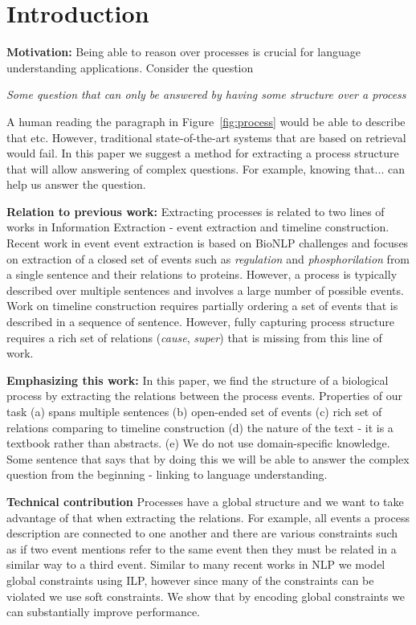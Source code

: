 \section{Introduction}

\textbf{Motivation:} Being able to reason over processes is crucial for language understanding applications. Consider the question 

\begin{description}
\item \emph{Some question that can only be answered by having some structure over a process}
\end{description}

\noindent A human reading the paragraph in Figure~\ref{fig:process} would be able to describe that etc. However, traditional state-of-the-art systems that are based on retrieval would fail. In this paper we suggest a method for extracting a process structure that will allow answering of complex questions. For example, knowing that... can help us answer the question.

\textbf{Relation to previous work:} 
Extracting processes is related to two lines of works in Information Extraction - event extraction and timeline construction. Recent work in event event extraction \cite{riedel11fast,Mcclosky11} is based on BioNLP challenges and focuses on extraction of a closed set of events such as \emph{regulation} and \emph{phosphorilation} from a single sentence and their relations to proteins. However, a process is typically described over multiple sentences and involves a large number of possible events. Work on timeline construction \cite{Do12,Mcclosky12} requires partially ordering a set of events that is described in a sequence of sentence. However, fully capturing process structure requires a rich set of relations (\emph{cause}, \emph{super}) that is missing from this line of work.

\textbf{Emphasizing this work:} In this paper, we find the structure of a biological process by extracting the relations between the process events. Properties of our task (a) spans multiple sentences (b) open-ended set of events (c) rich set of relations comparing to timeline construction (d) the nature of the text - it is a textbook rather than abstracts. (e) We do not use domain-specific knowledge. Some sentence that says that by doing this we will be able to answer the complex question from the beginning - linking to language understanding.

\textbf{Technical contribution} Processes have a global structure and we want to take advantage of that when extracting the relations. For example, all events a process description are connected to one another and there are various constraints such as if two event mentions refer to the same event then they must be related in a similar way to a third event. Similar to  many recent works in NLP \cite{} we model global constraints using ILP, however since many of the constraints can be violated we use soft constraints. We show that by encoding global constraints we can substantially improve performance.

